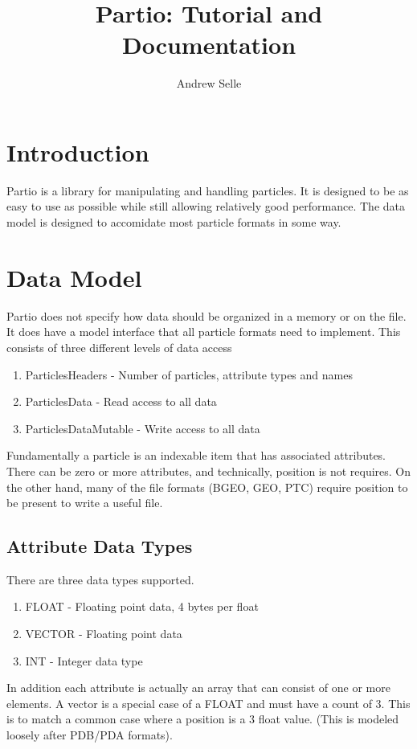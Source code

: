 \documentclass{article}
\begin{document}
\title{Partio: Tutorial and Documentation}
\author{Andrew Selle}
\maketitle

\section{Introduction}

Partio is a library for manipulating and handling particles. It is designed to be as easy to use as possible while still allowing relatively good performance.  The data model is designed to
accomidate most particle formats in some way.

\section{Data Model}

Partio does not specify how data should be organized in a memory or on the file. It does have a model interface that all particle formats need to implement. This consists of three different
levels of data access

\begin{enumerate}
\item ParticlesHeaders - Number of particles, attribute types and names
\item ParticlesData - Read access to all data
\item ParticlesDataMutable - Write access to all data
\end{enumerate}

Fundamentally a particle is an indexable item that has associated attributes. There can be zero or more attributes, and technically, position is not requires. On the other hand, many of the
file formats (BGEO, GEO, PTC) require position to be present to write a useful file.

\subsection{Attribute Data Types}

There are three data types supported. 
\begin{enumerate}
\item FLOAT - Floating point data, 4 bytes per float
\item VECTOR - Floating point data
\item INT - Integer data type
\end{enumerate}
In addition each attribute is actually an array that can consist of one or more elements. A vector is a special case of a FLOAT and must have a count of 3.  This is to match a common case
where a position is a 3 float value.  (This is modeled loosely after PDB/PDA formats). 
\end{document}
